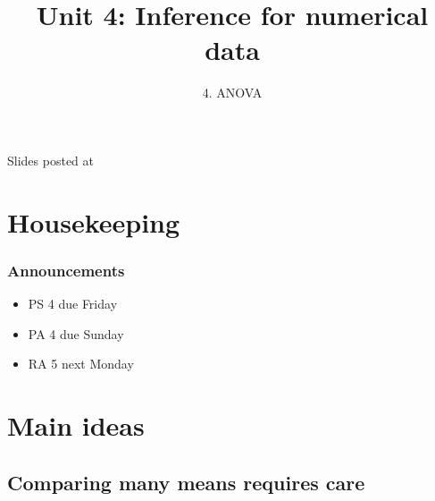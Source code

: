 \documentclass[slidestop,compress,mathserif,12pt,t,professionalfonts,xcolor=table]{beamer}
\title{Unit 4: Inference for numerical data}
\subtitle{4. ANOVA}
\author{\CourseName}
\date{}
\institute{\InstituteName}
\begin{document}



\begin{frame}[plain]

\titlepage

\vfill

{\scriptsize {} \hfill Slides posted at  \webURL{\CourseSite}}

\addtocounter{framenumber}{-1} 

\end{frame}


\section{Housekeeping}


\begin{frame}
\frametitle{Announcements}

\begin{itemize}

\item PS 4 due Friday

\item PA 4 due Sunday

\item RA 5 next Monday

\end{itemize}

\end{frame}


\section{Main ideas}


\subsection{Comparing many means requires care}
\label{mi1}

\end{document}
